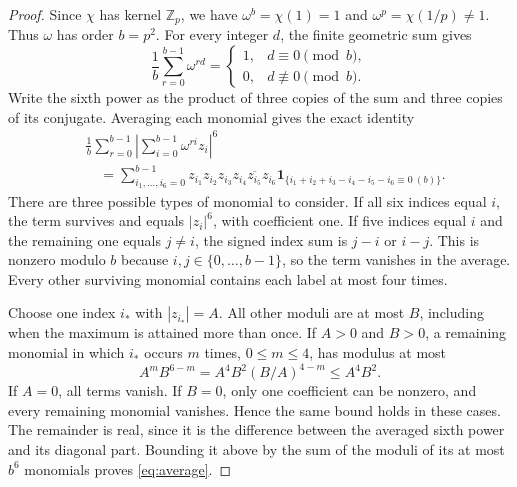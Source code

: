 \documentclass[11pt,twoside,a4paper]{article}
\numberwithin{equation}{section}
\theoremstyle{definition}
\newcommand{\Z}{\mathbb Z_p}
\newcommand{\one}{\mathbf 1}
\begin{document}
\begin{proof}
Since $\chi$ has kernel $\Z$, we have $\omega^b=\chi(1)=1$ and $\omega^p=\chi(1/p)\ne1$. Thus $\omega$ has order $b=p^2$. For every integer $d$, the finite geometric sum gives
$$
\frac1b\sum_{r=0}^{b-1}\omega^{rd}
=\begin{cases}1,&d\equiv0\pmod b,\\0,&d\not\equiv0\pmod b.\end{cases}
$$
Write the sixth power as the product of three copies of the sum and three copies of its conjugate. Averaging each monomial gives the exact identity
$$
\begin{aligned}
&\frac1b\sum_{r=0}^{b-1}\left|\sum_{i=0}^{b-1}\omega^{ri}z_i\right|^6\\
&\quad=\sum_{i_1,\ldots,i_6=0}^{b-1}
z_{i_1}z_{i_2}z_{i_3}\overline{z_{i_4}z_{i_5}z_{i_6}}
\one_{\{i_1+i_2+i_3-i_4-i_5-i_6\equiv0\ (b)\}}.
\end{aligned}
$$
There are three possible types of monomial to consider. If all six indices equal $i$, the term survives and equals $|z_i|^6$, with coefficient one. If five indices equal $i$ and the remaining one equals $j\ne i$, the signed index sum is $j-i$ or $i-j$. This is nonzero modulo $b$ because $i,j\in\{0,\ldots,b-1\}$, so the term vanishes in the average. Every other surviving monomial contains each label at most four times.

Choose one index $i_*$ with $|z_{i_*}|=A$. All other moduli are at most $B$, including when the maximum is attained more than once. If $A>0$ and $B>0$, a remaining monomial in which $i_*$ occurs $m$ times, $0\le m\le4$, has modulus at most
$$
A^mB^{6-m}=A^4B^2(B/A)^{4-m}\le A^4B^2.
$$
If $A=0$, all terms vanish. If $B=0$, only one coefficient can be nonzero, and every remaining monomial vanishes. Hence the same bound holds in these cases. The remainder is real, since it is the difference between the averaged sixth power and its diagonal part. Bounding it above by the sum of the moduli of its at most $b^6$ monomials proves \eqref{eq:average}.


\end{proof}
\end{document}
